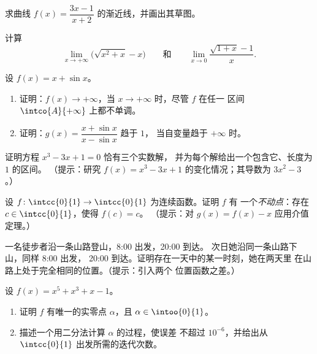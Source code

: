 \begin{exercise}[$\star$]\label{exo:g12:limcont:3}
求曲线
$f(x) = \dfrac{3x - 1}{x + 2}$ 的渐近线，并画出其草图。
\end{exercise}

\begin{exercise}[$\star\star$]\label{exo:g12:limcont:4}
计算
\[
\lim_{x\to+\infty} \bigl(\sqrt{x^2 + x} - x\bigr)
\qquad\text{和}\qquad
\lim_{x\to 0} \frac{\sqrt{1+x} - 1}{x}.
\]
\end{exercise}

\begin{exercise}[$\star\star$]\label{exo:g12:limcont:5}
设 $f(x) = x + \sin x$。
\begin{enumerate}
  \item 证明：$f(x) \to +\infty$，当 $x \to +\infty$ 时，尽管 $f$ 在任一
        区间 $\intco{A}{+\infty}$ 上都不单调。
  \item 证明：$g(x) = \dfrac{x + \sin x}{x - \sin x}$ 趋于 $1$，
        当自变量趋于 $+\infty$ 时。
\end{enumerate}
\end{exercise}

\begin{exercise}[$\star\star$]\label{exo:g12:limcont:6}
  证明方程 $x^3 - 3x + 1 = 0$ 恰有三个实数解，
  并为每个解给出一个包含它、长度为 $1$ 的区间。
  （提示：研究 $f(x) = x^3 - 3x + 1$ 的变化情况；其导数为
  $3x^2 - 3$。）
\end{exercise}

\begin{exercise}[$\star\star$]\label{exo:g12:limcont:7}
  设 $f \colon \intcc{0}{1} \to \intcc{0}{1}$ 为连续函数。证明 $f$ 有
  一个\emph{不动点}：存在 $c \in \intcc{0}{1}$，使得 $f(c) = c$。
  （提示：对 $g(x) = f(x) - x$ 应用介值定理。）
\end{exercise}

\begin{exercise}[$\star\star\star$]\label{exo:g12:limcont:8}
  一名徒步者沿一条山路登山，8:00 出发，20:00 到达。
  次日她沿同一条山路下山，同样 8:00 出发，
  20:00 到达。证明存在一天中的某一时刻，她在两天里
  在山路上处于完全相同的位置。（提示：引入两个
  位置函数之差。）
\end{exercise}

\begin{exercise}[$\star\star\star$]\label{exo:g12:limcont:9}
  设 $f(x) = x^5 + x^3 + x - 1$。
\begin{enumerate}
  \item 证明 $f$ 有唯一的实零点 $\alpha$，且
        $\alpha \in \intoo{0}{1}$。
  \item 描述一个用二分法计算 $\alpha$ 的过程，使误差
        不超过 $10^{-6}$，并给出从
        $\intcc{0}{1}$ 出发所需的迭代次数。
\end{enumerate}
\end{exercise}

